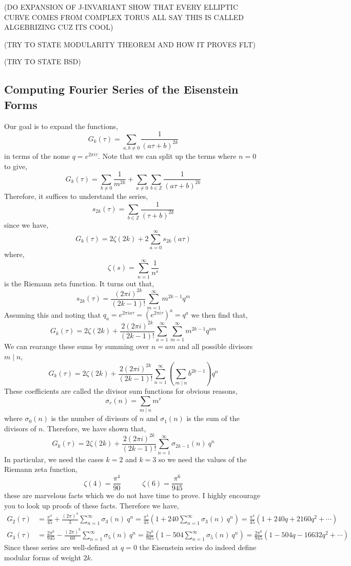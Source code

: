 \documentclass{article}
\newcommand{\divides}{\mid}
\newcommand{\Z}{\mathbb{Z}}
\theoremstyle{definition}
\begin{document}
{ \color{red}


(DO EXPANSION OF J-INVARIANT SHOW THAT EVERY ELLIPTIC CURVE COMES FROM COMPLEX TORUS ALL SAY THIS IS CALLED ALGEBRIZING CUZ ITS COOL)

(TRY TO STATE MODULARITY THEOREM AND HOW IT PROVES FLT)

(TRY TO STATE BSD)


\subsection{Computing Fourier Series of the Eisenstein Forms}

Our goal is to expand the functions,
\[ G_{k}(\tau) = \sum_{a,b \neq 0} \frac{1}{(a \tau + b)^{2k}} \]
in terms of the nome $q = e^{2 \pi i \tau}$. Note that we can split up the terms where $n = 0$ to give,
\[ G_{k}(\tau) = \sum_{b \neq 0} \frac{1}{m^{2k}} + \sum_{a \neq 0} \sum_{b \in \Z} \frac{1}{(a \tau + b)^{2k}}  \]
Therefore, it suffices to understand the series,
\[ s_{2k}(\tau) = \sum_{b \in \Z} \frac{1}{(\tau + b)^{2k}} \]
since we have,
\[ G_{k}(\tau) = 2 \zeta(2k) + 2 \sum_{a = 0}^\infty s_{2k}(a \tau) \]
where,
\[ \zeta(s) = \sum_{n = 1}^{\infty} \frac{1}{n^s} \]
is the Riemann zeta function.
It turns out that,
\[ s_{2k}(\tau) = \frac{(2 \pi i)^{2k}}{(2k - 1)!} \sum_{m = 1}^\infty m^{2k - 1} q^m \]
Assuming this and noting that $q_a = e^{2 \pi i a \tau} = (e^{2 \pi i \tau})^a = q^a$ we then find that,
\[ G_{k}(\tau) = 2 \zeta(2 k) + \frac{2 (2 \pi i)^{2k}}{(2 k - 1)!} \sum_{a = 1}^{\infty} \sum_{m = 1}^{\infty} m^{2k - 1} q^{am} \]
We can rearange these sums by summing over $n = am$ and all possible divisors $m \divides n$,
\[ G_{k}(\tau) = 2 \zeta(2 k) + \frac{2 (2 \pi i)^{2k}}{(2 k - 1)!} \sum_{n = 1}^{\infty} \left( \sum_{m \divides n} b^{2k - 1} \right) q^n \]
These coefficients are called the divisor sum functions for obvious reasons,
\[ \sigma_{r}(n) = \sum_{m \divides n} m^r \]
where $\sigma_0(n)$ is the number of divisors of $n$ and $\sigma_1(n)$ is the sum of the divisors of $n$. Therefore, we have shown that,
\[ G_{k}(\tau) = 2 \zeta(2 k) + \frac{2 (2 \pi i)^{2k}}{(2 k - 1)!} \sum_{n = 1}^{\infty} \sigma_{2k - 1}(n) \: q^n \]
In particular, we need the cases $k = 2$ and $k = 3$ so we need the values of the Riemann zeta function,
\[ \zeta(4) = \frac{\pi^4}{90} \quad \quad \quad \zeta(6) = \frac{\pi^6}{945} \]
these are marvelous facts which we do not have time to prove. I highly encourage you to look up proofs of these facts. Therefore we have,
\begin{align*}
G_2(\tau) & = \frac{\pi^4}{45} + \frac{(2 \pi)^4}{3} \sum_{n = 1}^{\infty} \sigma_{3}(n) \:  q^n = \frac{\pi^4}{45} \left( 1 + 240 \sum_{n = 1}^{\infty} \sigma_{3}(n) \:  q^n\right) = \frac{\pi^4}{45} \left( 1 + 240 q + 2160 q^2 + \cdots \right)
\\
G_3(\tau) & = \frac{2 \pi^6}{945} - \frac{(2 \pi)^6}{60} \sum_{n = 1}^{\infty} \sigma_{5}(n) \: q^n = \frac{2\pi^6}{945} \left( 1 - 504 \sum_{n = 1}^{\infty} \sigma_5(n) \: q^n \right) = \frac{2\pi^6}{945} \left( 1 - 504 q - 16632 q^2 + \cdots\right)
\end{align*} 
Since these series are well-defined at $q = 0$ the Eisenstein series do indeed define modular forms of weight $2k$. 

}
\end{document}
